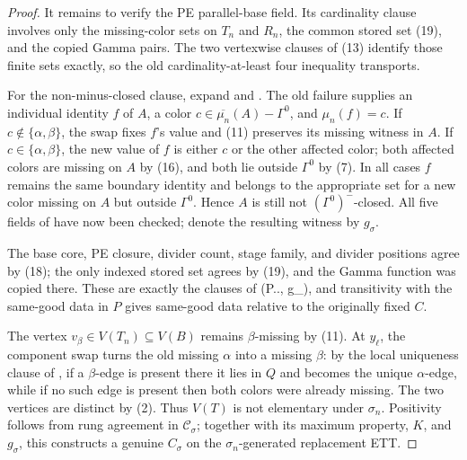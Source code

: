 \begin{proof}
It remains to verify the PE parallel-base field.  Its cardinality clause
involves only the missing-color sets on \(T_n\) and \(R_n\), the common
stored set (19), and the copied Gamma pairs.  The two vertexwise clauses
of (13) identify those finite sets exactly, so the old cardinality-at-least
four inequality transports.

For the non-minus-closed clause, expand
 and
.  The old failure supplies an individual
 identity \(f\) of \(A\), a color
\(c\in\overline{\mu_n}(A)-\Gamma^0\), and
\(\mu_n(f)=c\).  If \(c\notin\{\alpha,\beta\}\), the swap fixes \(f\)'s
value and (11) preserves its missing witness in \(A\).  If
\(c\in\{\alpha,\beta\}\), the new value of \(f\) is either \(c\) or the
other affected color; both affected colors are missing on \(A\) by
(16), and both lie outside \(\Gamma^0\) by (7).  In all cases \(f\)
remains the same boundary identity and belongs to the appropriate
 set for a new color missing on \(A\) but
outside \(\Gamma^0\).  Hence \(A\) is still not
\((\Gamma^0)^-\)-closed.  All five fields of
 have now been checked; denote the resulting
witness by \(g_\sigma\).

The base core, PE closure, divider count, stage family, and divider
positions agree by (18); the only indexed stored set agrees by (19), and
the Gamma function was copied there.  These are exactly the clauses of
(P..,
g_\sigma)\), and transitivity with the same-good data in \(P\) gives
same-good data relative to the originally fixed \(C\).

The vertex \(v_\beta\in V(T_n)\subseteq V(B)\) remains
\(\beta\)-missing by (11).  At \(y_\ell\), the component swap turns the
old missing \(\alpha\) into a missing \(\beta\): by the local uniqueness
clause of , if a \(\beta\)-edge is present
there it lies in \(Q\) and becomes the unique \(\alpha\)-edge,
while if no such edge is present then both colors were already missing.
The two vertices are distinct by (2).  Thus \(V(T)\) is not elementary
under \(\sigma_n\).  Positivity follows from rung agreement in
\(\mathcal C_\sigma\); together with its maximum property, \(K\), and
\(g_\sigma\), this constructs a genuine
 \(C_\sigma\) on the
\(\sigma_n\)-generated replacement ETT.


\end{proof}
